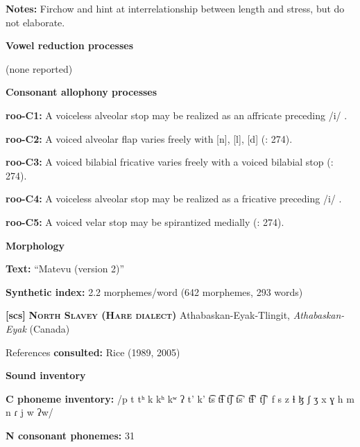 \textbf{Notes:} Firchow and \citet[271]{Firchow1969} hint at interrelationship between length and stress, but do not elaborate.



\textbf{Vowel reduction processes}



(none reported)



\textbf{Consonant allophony processes}



\textbf{roo-C1:} A voiceless alveolar stop may be realized as an affricate preceding /i/ \citep[28]{Robinson2011}.



\textbf{roo-C2:} A voiced alveolar flap varies freely with [n], [l], [d] (\citealt{FirchowFirchow1969}: 274).



\textbf{roo-C3:} A voiced bilabial fricative varies freely with a voiced bilabial stop (\citealt{FirchowFirchow1969}: 274).



\textbf{roo-C4:} A voiceless alveolar stop may be realized as a fricative preceding /i/ \citep[28]{Robinson2011}.



\textbf{roo-C5:} A voiced velar stop may be spirantized medially (\citealt{FirchowFirchow1969}: 274).



\textbf{Morphology}



\textbf{Text:} “Matevu (version 2)” \citep[293-304]{Robinson2011}



\textbf{Synthetic index:} 2.2 morphemes/word (642 morphemes, 293 words)



\textbf{[scs]}   \textbf{\textsc{North Slavey (Hare dialect)}}  Athabaskan-Eyak-Tlingit, \textit{Athabaskan-Eyak} (Canada)



References \textbf{consulted:} Rice (1989, 2005)



\textbf{Sound inventory}



\textbf{C phoneme inventory:} /p t tʰ k kʰ kʷ ʔ t’ k’ t͡s t͡ɬ t͡ʃ t͡s’ t͡ɬ’ t͡ʃ’ f s z ɬ ɮ ʃ ʒ x ɣ h m n ɾ j w ʔw/



\textbf{N consonant phonemes:} 31



